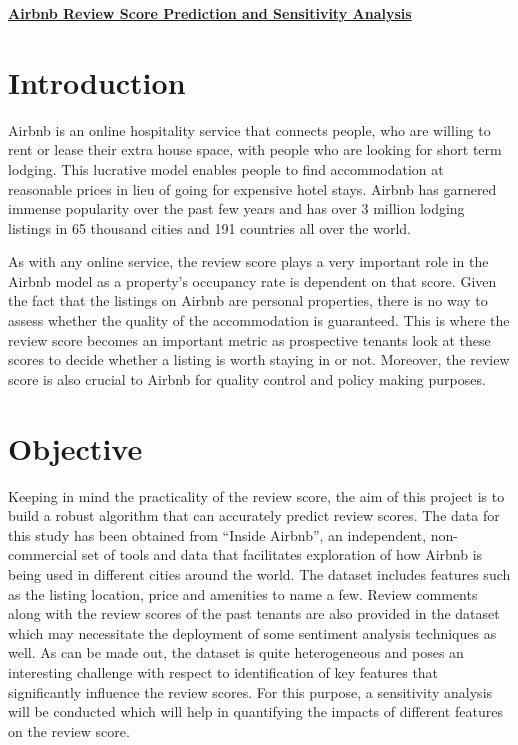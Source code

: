 \documentclass[11pt]{article}
\begin{document}
\pagestyle{fancy}
\fancyhf{}
\setlength{\headheight}{50pt}
\renewcommand{\headrulewidth}{0.4pt}
\renewcommand{\footrulewidth}{0.8pt}
\cfoot{\thepage}
\begin{center}
\Large{\textbf{\underline {Airbnb Review Score Prediction and Sensitivity Analysis}}}\\
\end{center}

\section*{Introduction}
Airbnb is an online hospitality service that connects people, who are willing to rent or lease their extra house space, with people who are looking for short term lodging. This lucrative model enables people to find accommodation at reasonable prices in lieu of going for expensive hotel stays. Airbnb has garnered immense popularity over the past few years and has over 3 million lodging listings in 65 thousand cities and 191 countries all over the world. 

\noindent As with any online service, the review score plays a very important role in the Airbnb model as a property’s occupancy rate is dependent on that score. Given the fact that the listings on Airbnb are personal properties, there is no way to assess whether the quality of the accommodation is guaranteed. This is where the review score becomes an important metric as prospective tenants look at these scores to decide whether a listing is worth staying in or not.  Moreover, the review score is also crucial to Airbnb for quality control and policy making purposes. 
\section*{Objective}
Keeping in mind the practicality of the review score, the aim of this project is to build a robust algorithm that can accurately predict review scores. The data for this study has been obtained from ``Inside Airbnb”, an independent, non-commercial set of tools and data that facilitates exploration of how Airbnb is being used in different cities around the world. The dataset includes features such as the listing location, price and amenities to name a few. Review comments along with the review scores of the past tenants are also provided in the dataset which may necessitate the deployment of some sentiment analysis techniques as well. As can be made out, the dataset is quite heterogeneous and poses an interesting challenge with respect to identification of key features that significantly influence the review scores. For this purpose, a sensitivity analysis will be conducted which will help in quantifying the impacts of different features on the review score.
\end{document}

